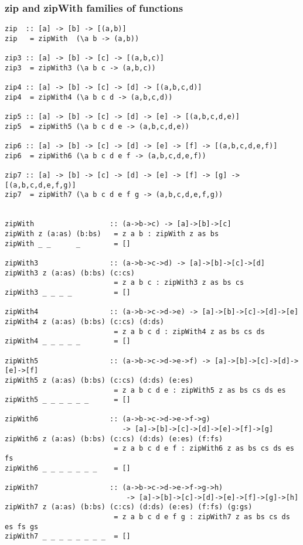 \subsubsection*{zip and zipWith families of functions}
\begin{verbatim}
zip  :: [a] -> [b] -> [(a,b)]
zip   = zipWith  (\a b -> (a,b))

zip3 :: [a] -> [b] -> [c] -> [(a,b,c)]
zip3  = zipWith3 (\a b c -> (a,b,c))

zip4 :: [a] -> [b] -> [c] -> [d] -> [(a,b,c,d)]
zip4  = zipWith4 (\a b c d -> (a,b,c,d))

zip5 :: [a] -> [b] -> [c] -> [d] -> [e] -> [(a,b,c,d,e)]
zip5  = zipWith5 (\a b c d e -> (a,b,c,d,e))

zip6 :: [a] -> [b] -> [c] -> [d] -> [e] -> [f] -> [(a,b,c,d,e,f)]
zip6  = zipWith6 (\a b c d e f -> (a,b,c,d,e,f))

zip7 :: [a] -> [b] -> [c] -> [d] -> [e] -> [f] -> [g] -> [(a,b,c,d,e,f,g)]
zip7  = zipWith7 (\a b c d e f g -> (a,b,c,d,e,f,g))


zipWith                  :: (a->b->c) -> [a]->[b]->[c]
zipWith z (a:as) (b:bs)   = z a b : zipWith z as bs
zipWith _ _      _        = []

zipWith3                 :: (a->b->c->d) -> [a]->[b]->[c]->[d]
zipWith3 z (a:as) (b:bs) (c:cs)
                          = z a b c : zipWith3 z as bs cs
zipWith3 _ _ _ _          = []

zipWith4                 :: (a->b->c->d->e) -> [a]->[b]->[c]->[d]->[e]
zipWith4 z (a:as) (b:bs) (c:cs) (d:ds)
                          = z a b c d : zipWith4 z as bs cs ds
zipWith4 _ _ _ _ _        = []

zipWith5                 :: (a->b->c->d->e->f) -> [a]->[b]->[c]->[d]->[e]->[f]
zipWith5 z (a:as) (b:bs) (c:cs) (d:ds) (e:es)
                          = z a b c d e : zipWith5 z as bs cs ds es
zipWith5 _ _ _ _ _ _      = []

zipWith6                 :: (a->b->c->d->e->f->g)
                            -> [a]->[b]->[c]->[d]->[e]->[f]->[g]
zipWith6 z (a:as) (b:bs) (c:cs) (d:ds) (e:es) (f:fs)
                          = z a b c d e f : zipWith6 z as bs cs ds es fs
zipWith6 _ _ _ _ _ _ _    = []

zipWith7                 :: (a->b->c->d->e->f->g->h)
                             -> [a]->[b]->[c]->[d]->[e]->[f]->[g]->[h]
zipWith7 z (a:as) (b:bs) (c:cs) (d:ds) (e:es) (f:fs) (g:gs)
                          = z a b c d e f g : zipWith7 z as bs cs ds es fs gs
zipWith7 _ _ _ _ _ _ _ _  = []
\end{verbatim}
